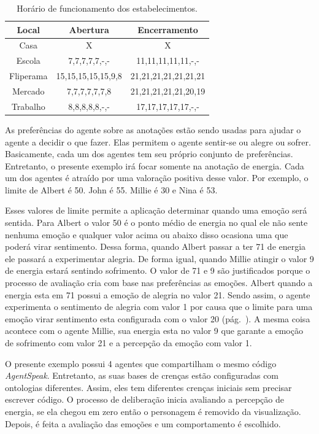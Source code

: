 \begin{table}[h]
	\caption{Horário de funcionamento dos estabelecimentos.}
	\label{tab:estaloca}
	\begin{center}
	\begin{tabular}{|c|c|c|}
		\hline
		Local & Abertura & Encerramento \\ \hline
		Casa & X & X \\ \hline
		Escola & 7,7,7,7,7,-,- & 11,11,11,11,11,-,- \\ \hline
		Fliperama & 15,15,15,15,15,9,8 & 21,21,21,21,21,21,21 \\ \hline
		Mercado & 7,7,7,7,7,7,8 & 21,21,21,21,21,20,19 \\ \hline
		Trabalho & 8,8,8,8,8,-,- & 17,17,17,17,17,-,- \\ \hline
	\end{tabular}
	\end{center}
\end{table}

As preferências do agente sobre as anotações estão sendo usadas para ajudar o
agente a decidir o que fazer. Elas permitem o agente sentir-se ou alegre ou
sofrer. Basicamente, cada um dos agentes tem seu próprio conjunto de
preferências. Entretanto, o presente exemplo irá focar somente na anotação de
energia. Cada um dos agentes é atraído por uma valoração positiva desse valor.
Por exemplo, o limite de Albert é 50. John é 55. Millie é 30 e Nina é 53.

Esses valores de limite permite a aplicação determinar quando uma emoção será
sentida. Para Albert o valor 50 é o ponto médio de energia no qual ele não
sente nenhuma emoção e qualquer valor acima ou abaixo disso ocasiona uma que
poderá virar sentimento. Dessa forma, quando Albert passar a ter 71 de energia
ele passará a experimentar alegria. De forma igual, quando Millie atingir o
valor 9 de energia estará sentindo sofrimento. O valor de 71 e 9 são
justificados porque o processo de avaliação cria com base nas preferências as
emoções. Albert quando a energia esta em 71 possui a emoção de alegria no
valor 21. Sendo assim, o agente experimenta o sentimento de alegria com valor
1 por causa que o limite para uma emoção virar sentimento esta configurada com o
valor 20 (pág.~\pageref{mark:emo}). A mesma coisa acontece com o agente Millie,
sua energia esta no valor 9 que garante a emoção de sofrimento com valor 21 e
a percepção da emoção com valor 1.

O presente exemplo possui 4 agentes que compartilham o mesmo código
\emph{AgentSpeak}. Entretanto, as suas bases de crenças estão configuradas com
ontologias diferentes. Assim, eles tem diferentes crenças iniciais sem
precisar escrever código. O processo de deliberação inicia avaliando a
percepção de energia, se ela chegou em zero então o personagem é removido da
visualização. Depois, é feita a avaliação das emoções e um comportamento é
escolhido.

